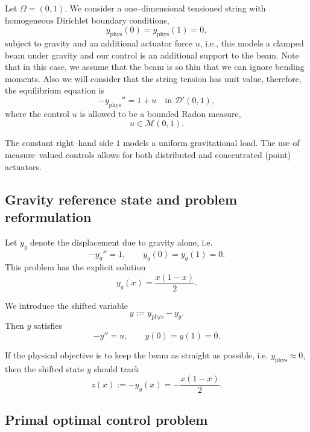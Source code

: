 \documentclass[11pt,a4paper]{article}
\begin{document}
Let $\Omega=(0,1)$.
We consider a one--dimensional tensioned string with homogeneous Dirichlet boundary conditions,
\[
y_{\mathrm{phys}}(0)=y_{\mathrm{phys}}(1)=0,
\]
subject to gravity and an additional actuator force $u$, i.e., this models a clamped beam under gravity and our control is an additional support to the beam. Note that in this case, we assume that the beam is so thin that we can ignore bending moments. Also we will consider that the string tension has unit value, therefore, the equilibrium equation is
\begin{equation}
- y_{\mathrm{phys}}'' = 1 + u
\quad \text{in } \mathcal D'(0,1),
\label{eq:physical-beam}
\end{equation}
where the control $u$ is allowed to be a bounded Radon measure,
\[
u \in \mathcal M(0,1).
\]

The constant right--hand side $1$ models a uniform gravitational load.
The use of measure--valued controls allows for both distributed and concentrated
(point) actuators.


\subsection*{Gravity reference state and problem reformulation}

Let $y_g$ denote the displacement due to gravity alone, i.e.
\[
- y_g'' = 1, \qquad y_g(0)=y_g(1)=0.
\]
This problem has the explicit solution
\begin{equation}
y_g(x) = \frac{x(1-x)}{2}.
\label{eq:gravity-sag}
\end{equation}

We introduce the shifted variable
\[
y := y_{\mathrm{phys}} - y_g.
\]
Then $y$ satisfies
\begin{equation}
- y'' = u, \qquad y(0)=y(1)=0.
\label{eq:shifted-state}
\end{equation}

If the physical objective is to keep the beam as straight as possible, i.e.
$y_{\mathrm{phys}}\approx 0$, then the shifted state $y$ should track
\[
z(x) := - y_g(x) = -\frac{x(1-x)}{2}.
\]


\subsection*{Primal optimal control problem}
\end{document}
